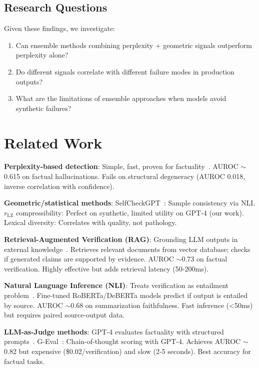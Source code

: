 \documentclass[11pt]{article}
\begin{document}
\subsection{Research Questions}

Given these findings, we investigate:
\begin{enumerate}
\item Can ensemble methods combining perplexity + geometric signals outperform perplexity alone?
\item Do different signals correlate with different failure modes in production outputs?
\item What are the limitations of ensemble approaches when models avoid synthetic failures?
\end{enumerate}

\section{Related Work}
\label{sec:related}

\textbf{Perplexity-based detection}:
Simple, fast, proven for factuality~\cite{lin2022truthfulqa}. AUROC $\sim$0.615 on factual hallucinations. Fails on structural degeneracy (AUROC 0.018, inverse correlation with confidence).

\textbf{Geometric/statistical methods}:
SelfCheckGPT~\cite{manakul2023selfcheck}: Sample consistency via NLI. $r_{\text{LZ}}$ compressibility: Perfect on synthetic, limited utility on GPT-4 (our work). Lexical diversity: Correlates with quality, not pathology.

\textbf{Retrieval-Augmented Verification (RAG)}:
Grounding LLM outputs in external knowledge~\cite{lewis2020rag}. Retrieves relevant documents from vector database; checks if generated claims are supported by evidence. AUROC $\sim$0.73 on factual verification. Highly effective but adds retrieval latency (50-200ms).

\textbf{Natural Language Inference (NLI)}:
Treats verification as entailment problem~\cite{nie2020nli}. Fine-tuned RoBERTa/DeBERTa models predict if output is entailed by source. AUROC $\sim$0.68 on summarization faithfulness. Fast inference (<50ms) but requires paired source-output data.

\textbf{LLM-as-Judge methods}:
GPT-4 evaluates factuality with structured prompts~\cite{zheng2023mtbench}. G-Eval~\cite{liu2023geval}: Chain-of-thought scoring with GPT-4. Achieves AUROC $\sim$0.82 but expensive (\$0.02/verification) and slow (2-5 seconds). Best accuracy for factual tasks.
\end{document}
